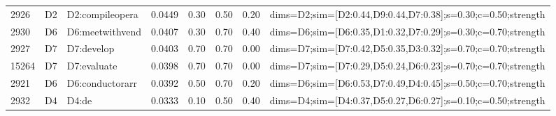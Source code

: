 \begin{table}[htbp]
\begin{tabular}{@{}lllllllc@{}}
2926 & D2 & D2:compileopera & 0.0449 & 0.30 & 0.50 & 0.20 & dims=D2;sim=[D2:0.44,D9:0.44,D7:0.38];s=0.30;c=0.50;strength \\
2930 & D6 & D6:meetwithvend & 0.0407 & 0.30 & 0.70 & 0.40 & dims=D6;sim=[D6:0.35,D1:0.32,D7:0.29];s=0.30;c=0.70;strength \\
2927 & D7 & D7:develop & 0.0403 & 0.70 & 0.70 & 0.00 & dims=D7;sim=[D7:0.42,D5:0.35,D3:0.32];s=0.70;c=0.70;strength \\
15264 & D7 & D7:evaluate & 0.0398 & 0.70 & 0.70 & 0.00 & dims=D7;sim=[D7:0.29,D5:0.24,D6:0.23];s=0.70;c=0.70;strength \\
2921 & D6 & D6:conductorarr & 0.0392 & 0.50 & 0.70 & 0.20 & dims=D6;sim=[D6:0.53,D7:0.49,D4:0.45];s=0.50;c=0.70;strength \\
2932 & D4 & D4:de & 0.0333 & 0.10 & 0.50 & 0.40 & dims=D4;sim=[D4:0.37,D5:0.27,D6:0.27];s=0.10;c=0.50;strength \\
\bottomrule
\end{tabular}
\end{table}